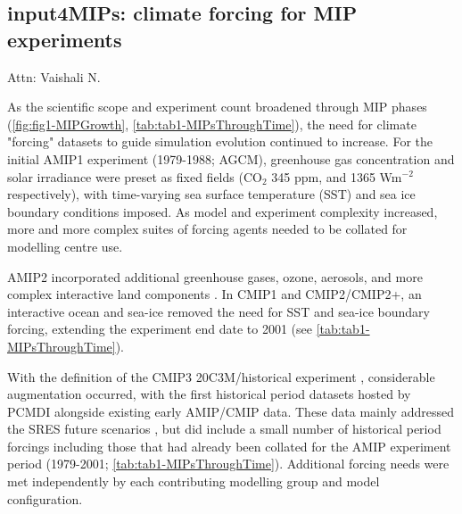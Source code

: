 \documentclass[gmd, preprint]{copernicus}
\def\cred#1{{\color{red}#1}}
\begin{document}
\subsection{input4MIPs: climate forcing for MIP experiments}
\label{sec:CMIP6SupportingProjects-input4MIPs}
\cred{Attn: Vaishali N.}

As the scientific scope and experiment count broadened through MIP phases (\autoref{fig:fig1-MIPGrowth}, \autoref{tab:tab1-MIPsThroughTime}), the need for climate "forcing" datasets to guide simulation evolution continued to increase. For the initial AMIP1  experiment (1979-1988; AGCM), greenhouse gas concentration and solar irradiance were preset as fixed fields (CO$_{2}$ 345 ppm, and 1365 Wm$^{-2}$ respectively), with time-varying sea surface temperature (SST) and sea ice boundary conditions imposed. As model and experiment complexity increased, more and more complex suites of forcing agents needed to be collated for modelling centre use.

AMIP2 incorporated additional greenhouse gases, ozone, aerosols, and more complex interactive land components \citep[e.g.,][]{gleckler_amip_1996-1,liang_pcmdi_1997}. In CMIP1 and CMIP2/CMIP2+, an interactive ocean and sea-ice removed the need for SST and sea-ice boundary forcing, extending the experiment end date to 2001 (see \autoref{tab:tab1-MIPsThroughTime}).

With the definition of the CMIP3 20C3M/historical experiment \citep[$\sim$1850-2000;][]{meehl_wcrp_2007}, considerable augmentation occurred, with the first historical period datasets hosted by PCMDI alongside existing early AMIP/CMIP data. These data mainly addressed the SRES future scenarios \citep[2001-2100/2200/2300;][]{nakicenovic_summary_2000}, but did include a small number of historical period forcings including those that had already been collated for the AMIP experiment period (1979-2001; \autoref{tab:tab1-MIPsThroughTime}). Additional forcing needs were met independently by each contributing modelling group and model configuration.
\end{document}
